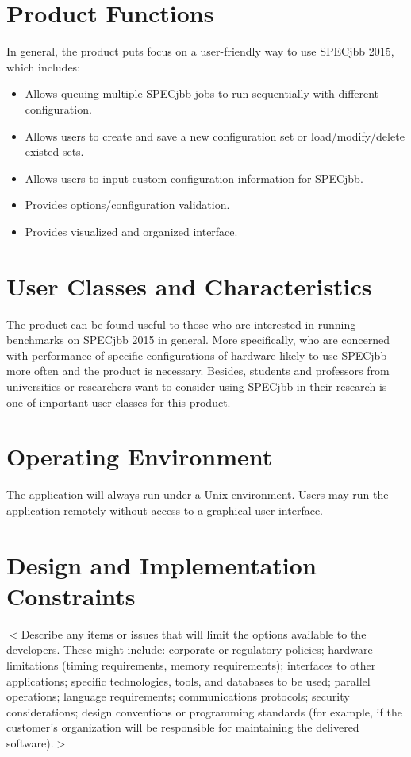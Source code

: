 \documentclass{scrreprt}
\begin{document}
\section{Product Functions}
In general, the product puts focus on a user-friendly way to use SPECjbb 2015, which includes:
\begin{itemize}
	\item Allows queuing multiple SPECjbb jobs to run sequentially with different configuration.
	\item Allows users to create and save a new configuration set or load/modify/delete existed sets.
	\item Allows users to input custom configuration information for SPECjbb.
	\item Provides options/configuration validation.
	\item Provides visualized and organized interface.
\end{itemize}

\section{User Classes and Characteristics}
The product can be found useful to those who are interested in running benchmarks on SPECjbb 2015 in general. More specifically, who are concerned with performance of specific configurations of hardware likely to use SPECjbb more often and the product is necessary. Besides, students and professors from universities or researchers want to consider using SPECjbb in their research is one of important user classes for this product.

\section{Operating Environment}
The application will always run under a Unix environment. Users may run the application remotely without access to a graphical user interface.

\section{Design and Implementation Constraints}
$<$Describe any items or issues that will limit the options available to the 
developers. These might include: corporate or regulatory policies; hardware 
limitations (timing requirements, memory requirements); interfaces to other 
applications; specific technologies, tools, and databases to be used; parallel 
operations; language requirements; communications protocols; security 
considerations; design conventions or programming standards (for example, if the 
customer’s organization will be responsible for maintaining the delivered 
software).$>$
\end{document}
